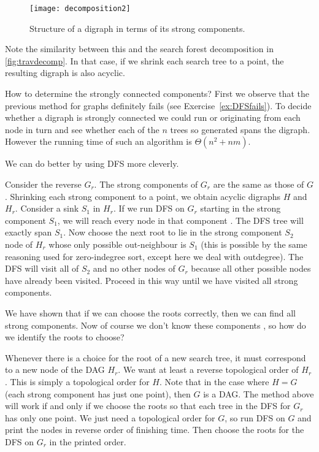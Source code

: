 \begin{figure}[htbp]
\centering
\texttt{[image: decomposition2]}
\caption{Structure of a digraph in terms of its strong components.}
\label{fig:sccdecomp}
\end{figure}

Note the similarity between this and the search forest decomposition
in \cref{fig:travdecomp}. In that case, if we shrink each
search tree to a point, the resulting digraph is also acyclic.

How to determine the strongly connected components? First we observe
that the previous method for graphs definitely fails (see
Exercise~\ref{ex:DFSfails}). To decide whether a digraph is strongly
connected we could run  or 
originating from each node in turn and see whether each of the $n$ trees
so generated spans the digraph. However the running time of such an
algorithm is $\Theta(n^2+nm)$.

We can do better by using DFS more cleverly. 

Consider the reverse $G_r$. The strong components of $G_r$ are the
same as those of $G$. Shrinking each strong component to a point,
we obtain  acyclic digraphs $H$ and $H_r$. Consider a sink $S_1$ in
$H_r$. If we run DFS on $G_r$ starting  in the strong component
$S_1$, we will reach every node in that component . The DFS tree will exactly span $S_1$. Now
choose the next root to lie in the strong component $S_2$ node of
$H_r$ whose only possible out-neighbour is $S_1$ (this is possible
by the same reasoning used for zero-indegree sort, except here we
deal with outdegree). The DFS will visit all of $S_2$ and no other
nodes of $G_r$ because all other possible nodes have already been
visited. Proceed in this way until we have visited all strong
components.

We have shown that if we can choose the roots correctly, then we can
find all strong components. Now of course we don't know these components
, so how do we identify the roots to choose?

Whenever there is a choice for the root of a new search tree, it must
correspond to a new node of the DAG $H_r$. We want at least a reverse
topological order of $H_r$. This is simply a topological order for
$H$. Note that in the case where $H=G$ (each strong component has just
one point), then $G$ is a DAG. The method above will work if and only
if we choose the roots so that each tree in the DFS for $G_r$ has only
one point. We just need a topological order for $G$, so run DFS on $G$
and print the nodes in reverse order of finishing time. Then choose the
roots for the DFS on $G_r$ in the printed order.

